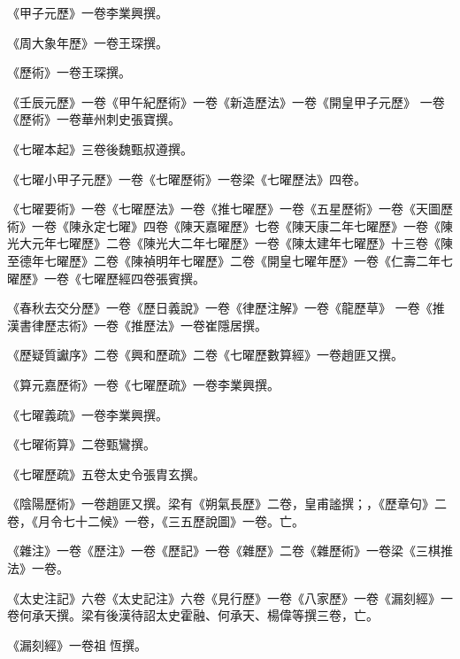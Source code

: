 \begin{pinyinscope}
 《甲子元歷》一卷李業興撰。



 《周大象年歷》一卷王琛撰。



 《歷術》一卷王琛撰。



 《壬辰元歷》一卷《甲午紀歷術》一卷《新造歷法》一卷《開皇甲子元歷》
 一卷《歷術》一卷華州刺史張寶撰。



 《七曜本起》三卷後魏甄叔遵撰。



 《七曜小甲子元歷》一卷《七曜歷術》一卷梁《七曜歷法》四卷。



 《七曜要術》一卷《七曜歷法》一卷《推七曜歷》一卷《五星歷術》一卷《天圖歷術》一卷《陳永定七曜》四卷《陳天嘉曜歷》七卷《陳天康二年七曜歷》一卷《陳光大元年七曜歷》二卷《陳光大二年七曜歷》一卷《陳太建年七曜歷》十三卷《陳至德年七曜歷》二卷《陳禎明年七曜歷》二卷《開皇七曜年歷》一卷《仁壽二年七曜歷》一卷《七曜歷經四卷張賓撰。



 《春秋去交分歷》一卷《歷日義說》一卷《律歷注解》一卷《龍歷草》
 一卷《推漢書律歷志術》一卷《推歷法》一卷崔隱居撰。



 《歷疑質讞序》二卷《興和歷疏》二卷《七曜歷數算經》一卷趙匪又撰。



 《算元嘉歷術》一卷《七曜歷疏》一卷李業興撰。



 《七曜義疏》一卷李業興撰。



 《七曜術算》二卷甄鸞撰。



 《七曜歷疏》五卷太史令張胄玄撰。



 《陰陽歷術》一卷趙匪又撰。梁有《朔氣長歷》二卷，皇甫謐撰；，《歷章句》二卷，《月令七十二候》一卷，《三五歷說圖》一卷。亡。



 《雜注》一卷《歷注》一卷《歷記》一卷《雜歷》二卷《雜歷術》一卷梁《三棋推法》一卷。



 《太史注記》六卷《太史記注》六卷《見行歷》一卷《八家歷》一卷《漏刻經》一卷何承天撰。梁有後漢待詔太史霍融、何承天、楊偉等撰三卷，亡。



 《漏刻經》一卷祖恆撰。




\end{pinyinscope}
